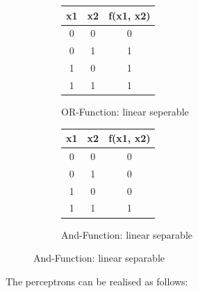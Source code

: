 \documentclass[10pt,a4paper,DIV=11]{scrreprt}
\begin{document}
\begin{figure}[H]
	\begin{subfigure}[]{0.5\linewidth}
	\centering
	\begin{tabular}{|c|c|c|}
		\hline
		x1 & x2 & f(x1, x2)\\
		\hline
		0 & 0 & 0 \\
		\hline
		0 & 1 & 1 \\
		\hline
		1 & 0 & 1 \\
		\hline
		1 & 1 & 1 \\
		\hline
	\end{tabular}
	\caption{OR-Function: linear seperable}
	\label{fig:linsep1}
	\end{subfigure}
\begin{subfigure}[]{0.5\linewidth}
	\centering
	\begin{tabular}{|c|c|c|}
		\hline
		x1 & x2 & f(x1, x2)\\
		\hline
		0 & 0 & 0 \\
		\hline
		0 & 1 & 0 \\
		\hline
		1 & 0 & 0 \\
		\hline
		1 & 1 & 1 \\
		\hline
	\end{tabular}
	\caption{And-Function: linear separable}
	\label{fig:linsep2}
\end{subfigure}
\end{figure}

The perceptrons can be realised as follows:
\end{document}
